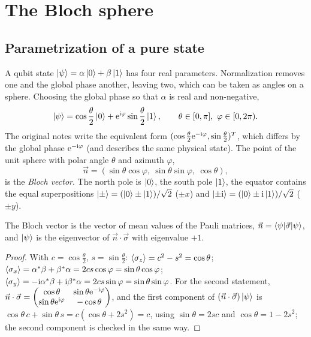 \section{The Bloch sphere}
\subsection{Parametrization of a pure state}
A qubit state $\left|\psi\right\rangle=\alpha\left|0\right\rangle+\beta\left|1\right\rangle$ has four real parameters. Normalization removes one and the global phase another, leaving two,
which can be taken as angles on a sphere. Choosing the global phase so that $\alpha$ is real and non-negative,
\begin{equation}\label{eq:blochstate}
  \ket\psi=\cos\frac\theta2\ket0+\e^{\ii\varphi}\sin\frac\theta2\ket1,\qquad\theta\in[0,\pi],\ \varphi\in[0,2\pi).
\end{equation}
The original notes write the equivalent form $(\cos\frac\theta2\mathrm e^{-\mathrm i\varphi},\sin\frac\theta2)^T$, which differs by the global phase
$\mathrm e^{-\mathrm i\varphi}$ (and describes the same physical state). The point of the unit sphere with polar angle $\theta$ and azimuth $\varphi$,
\begin{equation}
  \vec n=(\sin\theta\cos\varphi,\ \sin\theta\sin\varphi,\ \cos\theta),
\end{equation}
is the \emph{Bloch vector}. The north pole is $\left|0\right\rangle$, the south pole $\left|1\right\rangle$, the equator contains the equal superpositions
$\left|\pm\right\rangle=(\left|0\right\rangle\pm\left|1\right\rangle)/\sqrt2$ ($\pm x$) and $\left|\pm\mathrm i\right\rangle=(\left|0\right\rangle\pm\mathrm i\left|1\right\rangle)/\sqrt2$ ($\pm y$).

\begin{proposition}\label{prop:blochvector}
The Bloch vector is the vector of mean values of the Pauli matrices, $\vec n=\left\langle\psi\middle|\vec\sigma\middle|\psi\right\rangle$, and $\left|\psi\right\rangle$ is the eigenvector of
$\vec n\cdot\vec\sigma$ with eigenvalue $+1$.
\end{proposition}
\begin{proof}
With $c=\cos\frac\theta2$, $s=\sin\frac\theta2$:
$\left\langle\sigma_z\right\rangle=c^2-s^2=\cos\theta$;
$\left\langle\sigma_x\right\rangle=\alpha^*\beta+\beta^*\alpha=2cs\cos\varphi=\sin\theta\cos\varphi$;
$\left\langle\sigma_y\right\rangle=-\mathrm i\alpha^*\beta+\mathrm i\beta^*\alpha=2cs\sin\varphi=\sin\theta\sin\varphi$.
For the second statement,
$\vec n\cdot\vec\sigma=\begin{pmatrix}\cos\theta&\sin\theta\mathrm e^{-\mathrm i\varphi}\\ \sin\theta\mathrm e^{\mathrm i\varphi}&-\cos\theta\end{pmatrix}$, and
the first component of $(\vec n\cdot\vec\sigma)\left|\psi\right\rangle$ is $\cos\theta\,c+\sin\theta\,s=c(\cos\theta+2s^2)=c$, using
$\sin\theta=2sc$ and $\cos\theta=1-2s^2$; the second component is checked in the same way.
\end{proof}

